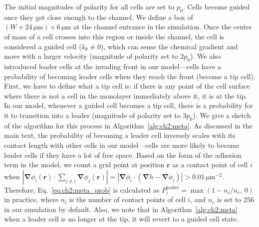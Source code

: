 The initial magnitudes of polarity for all cells are set to $p_0$.
Cells become guided once they get close enough to the channel.
We define a box of $(W+24\,\mathrm{\mu m})\times 6\,\mathrm{\mu m}$ at the channel entrance in the simulation.
Once the center of mass of a cell crosses into this region or inside the channel, the cell is considered a guided cell ($k_\theta\neq 0$), which can sense the chemical gradient and move with a larger velocity (magnitude of polarity set to $2p_0$).
We also introduced leader cells at the invading front in our model---cells have a probability of becoming leader cells when they reach the front (become a tip cell).
First, we have to define what a tip cell is: if there is any point of the cell surface where there is not a cell in the monolayer immediately above it, it is at the tip.
In our model, whenever a guided cell becomes a tip cell, there is a probability for it to transition into a leader (magnitude of polarity set to $3p_0$).
We give a sketch of the algorithm for this process in Algorithm~\ref{alg:ch2:meta}.
As discussed in the main text, the probability of becoming a leader cell inversely scales with its contact length with other cells in our model---cells are more likely to become leader cells if they have a lot of free space.
Based on the form of the adhesion term in the model, we count a grid point at position $\mathbf r$ as a contact point of cell $i$ when $|\bm{\nabla}\phi_i(\mathbf r)\cdot\sum_{j\neq i}\bm{\nabla}\phi_j(\mathbf r)|=|\bm{\nabla}\phi_i\cdot(\bm{\nabla}h-\bm{\nabla}\phi_i)|>0.01\,\mathrm{\mu m^{-2}}$.
Therefore, Eq.~\eqref{eq:ch2:meta_prob} is calculated as $P_i^\textrm{leader}=\max(1-n_i/n_c,\,0)$ in practice, where $n_i$ is the number of contact points of cell $i$, and $n_c$ is set to $256$ in our simulation by default.
Also, we note that in Algorithm~\ref{alg:ch2:meta} when a leader cell is no longer at the tip, it will revert to a guided cell state.

\begin{algorithm}[tbp]
\LinesNumbered
\caption{How to identify cell states}\label{alg:ch2:meta}
\BlankLine
{}
\end{algorithm}

